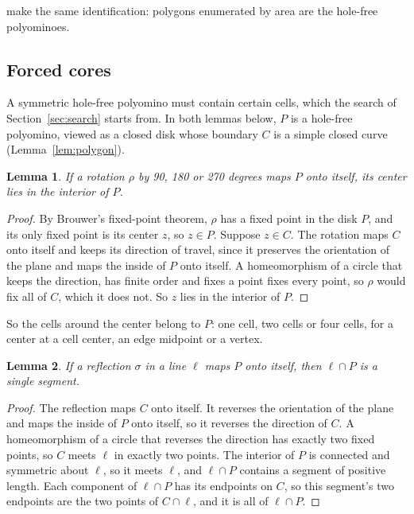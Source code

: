 \documentclass[11pt]{a000104}
\numberwithin{equation}{section}
\newtheorem{lemma}{Lemma}[section]
\begin{document}
\textcite[1]{JensenGuttmann:2000} make the same identification: polygons enumerated by area are the hole-free polyominoes.

\subsection{Forced cores}

A symmetric hole-free polyomino must contain certain cells, which the search of Section~\ref{sec:search} starts from.
In both lemmas below, $P$ is a hole-free polyomino, viewed as a closed disk whose boundary $C$ is a simple closed curve (Lemma~\ref{lem:polygon}).

\begin{lemma}\label{lem:rotation}
If a rotation $\rho$ by 90, 180 or 270 degrees maps $P$ onto itself, its center lies in the interior of $P$.
\end{lemma}

\begin{proof}
By Brouwer's fixed-point theorem, $\rho$ has a fixed point in the disk $P$, and its only fixed point is its center $z$, so $z \in P$.
Suppose $z \in C$.
The rotation maps $C$ onto itself and keeps its direction of travel, since it preserves the orientation of the plane and maps the inside of $P$ onto itself.
A homeomorphism of a circle that keeps the direction, has finite order and fixes a point fixes every point, so $\rho$ would fix all of $C$, which it does not.
So $z$ lies in the interior of $P$.
\end{proof}

So the cells around the center belong to $P$: one cell, two cells or four cells, for a center at a cell center, an edge midpoint or a vertex.

\begin{lemma}\label{lem:mirror}
If a reflection $\sigma$ in a line $\ell$ maps $P$ onto itself, then $\ell \cap P$ is a single segment.
\end{lemma}

\begin{proof}
The reflection maps $C$ onto itself.
It reverses the orientation of the plane and maps the inside of $P$ onto itself, so it reverses the direction of $C$.
A homeomorphism of a circle that reverses the direction has exactly two fixed points, so $C$ meets $\ell$ in exactly two points.
The interior of $P$ is connected and symmetric about $\ell$, so it meets $\ell$, and $\ell \cap P$ contains a segment of positive length.
Each component of $\ell \cap P$ has its endpoints on $C$, so this segment's two endpoints are the two points of $C \cap \ell$, and it is all of $\ell \cap P$.
\end{proof}
\end{document}
